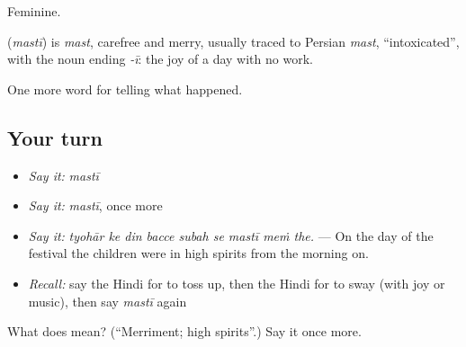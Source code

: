 Feminine.

\begin{cousinweb}
\textbf{} (\emph{mastī}) is \emph{mast}, carefree and merry, usually traced to Persian \emph{mast}, \textquotedblleft{}intoxicated\textquotedblright{}, with the noun ending \emph{-ī}: the joy of a day with no work.
\end{cousinweb}

\begin{grammarlens}[title={What you've built}]
One more word for telling what happened.
\end{grammarlens}

\subsection*{Your turn}
\begin{itemize}
\raggedright
  \item \emph{Say it:} \emph{mastī}
  \item \emph{Say it:} \emph{mastī}, once more
  \item \emph{Say it:} \emph{tyohār ke din bacce subah se mastī meṁ the.} — On the day of the festival the children were in high spirits from the morning on.
  \item \emph{Recall:} say the Hindi for to toss up, then the Hindi for to sway (with joy or music), then say \emph{mastī} again
\end{itemize}

\begin{tcolorbox}[breakable,colback=teal!4,colframe=teal!35!black,title={Before you move on}]
What does  mean? (\textquotedblleft{}Merriment; high spirits\textquotedblright{}.) Say it once more.
\end{tcolorbox}
